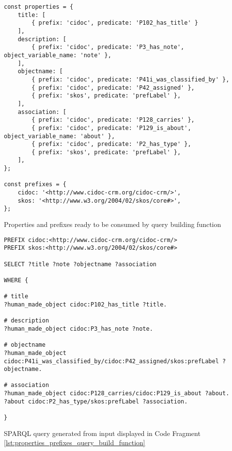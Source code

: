 %
%
%
\begin{listing}[htbp]
    \begin{verbatim}
const properties = {
    title: [
        { prefix: 'cidoc', predicate: 'P102_has_title' }
    ],
    description: [
        { prefix: 'cidoc', predicate: 'P3_has_note', object_variable_name: 'note' },
    ],
    objectname: [
        { prefix: 'cidoc', predicate: 'P41i_was_classified_by' },
        { prefix: 'cidoc', predicate: 'P42_assigned' },
        { prefix: 'skos', predicate: 'prefLabel' },
    ],
    association: [
        { prefix: 'cidoc', predicate: 'P128_carries' },
        { prefix: 'cidoc', predicate: 'P129_is_about', object_variable_name: 'about' },
        { prefix: 'cidoc', predicate: 'P2_has_type' },
        { prefix: 'skos', predicate: 'prefLabel' },
    ],
};

const prefixes = {
    cidoc: '<http://www.cidoc-crm.org/cidoc-crm/>',
    skos: '<http://www.w3.org/2004/02/skos/core#>',
};
    \end{verbatim}
    \caption{Properties and prefixes ready to be consumed by query building function}
    \label{lst:properties_prefixes_query_build_function}
\end{listing}
\begin{listing}[htbp]
    \begin{verbatim}
PREFIX cidoc:<http://www.cidoc-crm.org/cidoc-crm/>
PREFIX skos:<http://www.w3.org/2004/02/skos/core#>

SELECT ?title ?note ?objectname ?association

WHERE {

# title
?human_made_object cidoc:P102_has_title ?title.

# description
?human_made_object cidoc:P3_has_note ?note.

# objectname
?human_made_object cidoc:P41i_was_classified_by/cidoc:P42_assigned/skos:prefLabel ?objectname.

# association
?human_made_object cidoc:P128_carries/cidoc:P129_is_about ?about.
?about cidoc:P2_has_type/skos:prefLabel ?association.

}
    \end{verbatim}
    \caption{SPARQL query generated from input displayed in Code Fragment \ref{lst:properties_prefixes_query_build_function}}
    \label{lst:query_generated_edge_cases}
\end{listing}







